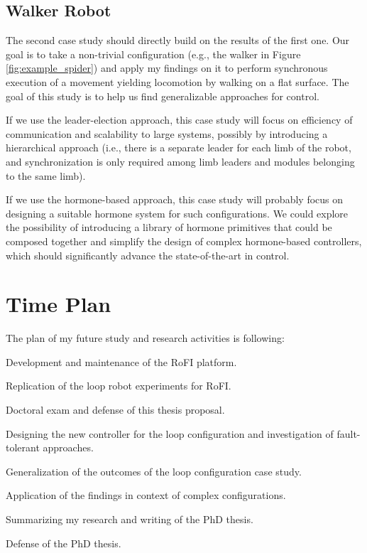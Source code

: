 \subsection{Walker Robot}

The second case study should directly build on the results of the first one. Our
goal is to take a non-trivial configuration (e.g., the walker in Figure
\ref{fig:example_spider}) and apply my findings on it to perform synchronous
execution of a movement yielding locomotion by walking on a flat surface. The
goal of this study is to help us find generalizable approaches for control.

If we use the leader-election approach, this case study will focus on efficiency
of communication and scalability to large systems, possibly by introducing a
hierarchical approach (i.e., there is a separate leader for each limb of the
robot, and synchronization is only required among limb leaders and modules
belonging to the same limb).

If we use the hormone-based approach, this case study will probably focus on
designing a suitable hormone system for such configurations. We could explore
the possibility of introducing a library of hormone primitives that could be
composed together and simplify the design of complex hormone-based controllers,
which should significantly advance the state-of-the-art in control.

\section{Time Plan}

The plan of my future study and research activities is following:

\begin{description}[style=nextline,leftmargin=0.8cm]
    \item [now -- January 2023]
        Development and maintenance of the RoFI platform.
    \item [now -- January 2021]
        Replication of the loop robot experiments for RoFI.
    \item [January 2021]
        Doctoral exam and defense of this thesis proposal.
    \item [February 2021 -- June 2021]
        Designing the new controller for the loop configuration and
        investigation of fault-tolerant approaches.
    \item [June 2021 -- December 2022]
        Generalization of the outcomes of the loop configuration case study.
    \item[January 2022 -- August 2022]
        Application of the findings in context of complex configurations.
    \item[September 2022 -- January 2023]
        Summarizing my research and writing of the PhD thesis.
    \item[January 2023]
        Defense of the PhD thesis.
\end{description}
